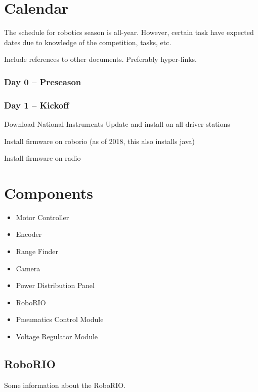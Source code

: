 \documentclass[letterpaper,10pt]{memoir}
\begin{document}
\tableofcontents



\chapter{Calendar}

The schedule for robotics season is all-year. However, certain task have expected dates due to knowledge of the competition, tasks, etc.

Include references to other documents. Preferably hyper-links.

\subsection{Day 0 -- Preseason}


\subsection{Day 1 -- Kickoff}

Download National Instruments Update and install on all driver stations

Install firmware on roborio (as of 2018, this also installs java)

Install firmware on radio





\chapter{Components}

\begin{itemize}
\item Motor Controller
\item Encoder
\item Range Finder
\item Camera
\item Power Distribution Panel
\item RoboRIO
\item Pneumatics Control Module
\item Voltage Regulator Module
\end{itemize}


\newpage\section*{RoboRIO}

Some information about the RoboRIO.
\end{document}
